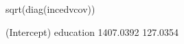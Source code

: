 \begin{Schunk}
\begin{Sinput}
 sqrt(diag(incedvcov))
\end{Sinput}
\begin{Soutput}
(Intercept)   education 
  1407.0392    127.0354 
\end{Soutput}
\end{Schunk}
